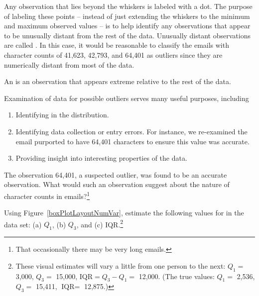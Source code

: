 Any observation that lies beyond the whiskers is labeled with a dot. The purpose of labeling these points -- instead of just extending the whiskers to the minimum and maximum observed values -- is to help identify any observations that appear to be unusually distant from the rest of the data. Unusually distant observations are called . In this case, it would be reasonable to classify the emails with character counts of 41,623, 42,793, and 64,401 as outliers since they are numerically distant from most of the data.

\begin{termBox}{
An  is an observation that appears extreme relative to the rest of the data.}
\end{termBox}


\begin{tipBox}{
Examination of data for possible outliers serves many useful purposes, including\vspace{-2mm}
\begin{enumerate}
\setlength{\itemsep}{0mm}
\item Identifying  in the distribution.
\item Identifying data collection or entry errors. For instance, we re-examined the email purported to have 64,401 characters to ensure this value was accurate.
\item Providing insight into interesting properties of the data.\vspace{0.5mm}
\end{enumerate}}
\end{tipBox}

\begin{exercise}
The observation 64,401, a suspected outlier, was found to be an accurate observation. What would such an observation suggest about the nature of character counts in emails?\footnote{That occasionally there may be very long emails.}\end{exercise}

\begin{exercise}
Using Figure~\ref{boxPlotLayoutNumVar}, estimate the following values for  in the  data set: (a) $Q_1$, (b) $Q_3$, and (c) IQR.\footnote{These visual estimates will vary a little from one person to the next: $Q_1=$ 3,000, $Q_3=$ 15,000, $\text{IQR}=Q_3 - Q_1 = $ 12,000. (The true values: $Q_1=$ 2,536, $Q_3=$ 15,411, $\text{IQR} = $ 12,875.)}
\end{exercise}

